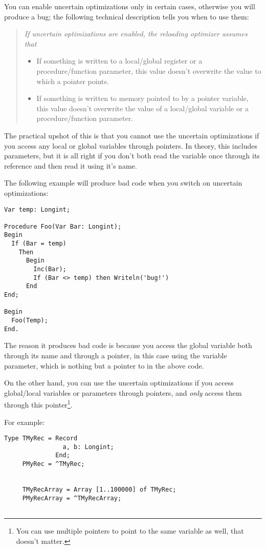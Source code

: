 \documentclass{report}
\begin{document}
\begin{enumerate}
You can enable uncertain optimizations only in certain cases, 
otherwise you will produce a bug; the following technical description 
tells you when to use them:
\begin{quote}
\em
If uncertain optimizations are enabled, the reloading optimizer assumes 
that
\begin{itemize}
\item If something is written to a local/global register or a 
procedure/function parameter, this value doesn't overwrite the value to 
which a pointer points.
\item If something is written to memory pointed to by a pointer variable, 
this value doesn't overwrite the value of a local/global variable or a 
procedure/function parameter.
\end{itemize}
\end{quote}
The practical upshot of this is that you cannot use the uncertain
optimizations if you access any local or global variables through pointers. In 
theory, this includes  parameters, but it is all right 
if you don't both read the variable once through its  reference 
and then read it using it's name. 

The following example will produce bad code when you switch on
uncertain optimizations:
\begin{verbatim}
Var temp: Longint;

Procedure Foo(Var Bar: Longint);
Begin
  If (Bar = temp)
    Then
      Begin
        Inc(Bar);
        If (Bar <> temp) then Writeln('bug!')
      End
End;

Begin
  Foo(Temp);
End.
\end{verbatim}
The reason it produces bad code is because you access the global variable
 both through its name  and through a pointer, in this
case using the  variable parameter, which is nothing but a pointer
to  in the above code.

On the other hand, you can use the uncertain optimizations if
you access global/local variables or parameters through pointers, 
and {\em only} access them through this pointer\footnote{
You can use multiple pointers to point to the same variable as well, that 
doesn't matter.}.

For example:
\begin{verbatim}
Type TMyRec = Record
                a, b: Longint;
              End;
     PMyRec = ^TMyRec;


     TMyRecArray = Array [1..100000] of TMyRec;
     PMyRecArray = ^TMyRecArray;


\end{verbatim}
\end{enumerate}
\end{document}
